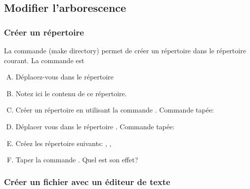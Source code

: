 \subsection{Modifier l'arborescence}

\subsubsection{Créer un répertoire}

La commande  (make directory) permet de créer un répertoire dans le répertoire courant. La commande est 

\medskip

\exer

\begin{enumerate}[A.]
	\item Déplacez-vous dans le répertoire 
	\item Notez ici le contenu de ce répertoire. \dotfill
	
	\dotfill
	
	\item Créer un répertoire  en utilisant la commande . Commande tapée: \dotfill
	
	\dotfill
	
	\item Déplacer vous dans le répertoire . Commande tapée: \dotfill
	
	\item Créez les répertoire suivants: , , 
	\item Taper la commande . Quel est son effet? \dotfill
	
	\dotfill
	
	\dotfill
\end{enumerate}

\bigskip

\subsubsection{Créer un fichier avec un éditeur de texte}

\exer

